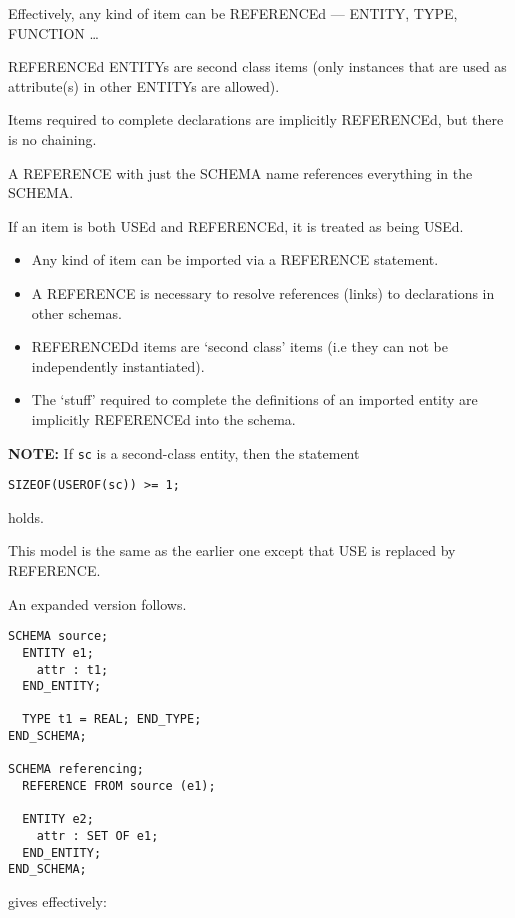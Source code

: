 \begin{remarks}
\remintro


Effectively, any kind of item can be REFERENCEd --- 
ENTITY, TYPE, FUNCTION \ldots

REFERENCEd ENTITYs are second class items (only instances that are used as
attribute(s) in other ENTITYs are allowed).

Items required to complete declarations are implicitly REFERENCEd, but
there is no chaining.

A REFERENCE with just the SCHEMA name references everything in the SCHEMA.

If an item is both USEd and REFERENCEd, it is treated as being USEd.

\remend
\end{remarks}


\begin{itemize}
\item Any kind of item can be imported via a REFERENCE statement.
\item A REFERENCE is necessary to resolve references (links) to declarations
      in other schemas.
\item REFERENCEDd items are `second class' items (i.e they can not be 
      independently instantiated).
\item The `stuff' required to complete the definitions of an imported entity
      are implicitly REFERENCEd into the schema.
\end{itemize}

\textbf{NOTE:} If \verb|sc| is a second-class entity, then the statement
\begin{verbatim}
SIZEOF(USEROF(sc)) >= 1;
\end{verbatim}
holds.

\begin{remarks}
\remintro


This model is the same as the earlier one except that USE is
replaced by REFERENCE.

An expanded version follows.


\remend
\end{remarks}


\begin{verbatim}
SCHEMA source;
  ENTITY e1;
    attr : t1;
  END_ENTITY;

  TYPE t1 = REAL; END_TYPE;
END_SCHEMA;

SCHEMA referencing;
  REFERENCE FROM source (e1);

  ENTITY e2;
    attr : SET OF e1;
  END_ENTITY;
END_SCHEMA;
\end{verbatim}
gives effectively:

